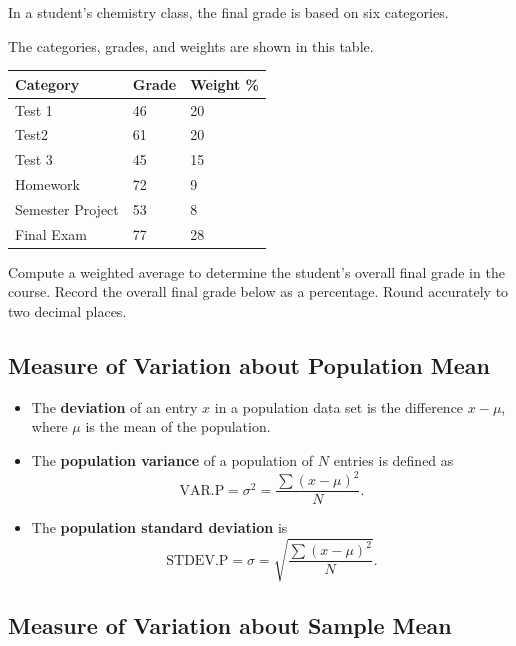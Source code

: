 \begin{exercise}

In a student's chemistry class, the final grade is based on six
categories.

The categories, grades, and weights are shown in this table.

\begin{longtable}[]{@{}lll@{}}
\toprule()
Category & Grade & Weight \% \\
\midrule()
\endhead
Test 1 & 46 & 20 \\
Test2 & 61 & 20 \\
Test 3 & 45 & 15 \\
Homework & 72 & 9 \\
Semester Project & 53 & 8 \\
Final Exam & 77 & 28 \\
\bottomrule()
\end{longtable}

Compute a weighted average to determine the student's overall final
grade in the course. Record the overall final grade below as a
percentage. Round accurately to two decimal places.

\end{exercise}
\vspace*{6\baselineskip}

\hypertarget{measure-of-variation-about-population-mean}{%
\subsection{Measure of Variation about Population
Mean}\label{measure-of-variation-about-population-mean}}

\begin{itemize}
\item
  The \textbf{deviation} of an entry \(x\) in a population data set is
  the difference \(x-\mu\), where \(\mu\) is the mean of the population.
\item
  The \textbf{population variance} of a population of \(N\) entries is
  defined as \[
    \text{VAR.P}=\sigma^2=\dfrac{\sum(x-\mu)^2}{N}.
  \]
\item
  The \textbf{population standard deviation} is \[
    \text{STDEV.P}=\sigma=\sqrt{\dfrac{\sum(x-\mu)^2}{N}}.
  \]
\end{itemize}

\hypertarget{measure-of-variation-about-sample-mean}{%
\subsection{Measure of Variation about Sample
Mean}\label{measure-of-variation-about-sample-mean}}


